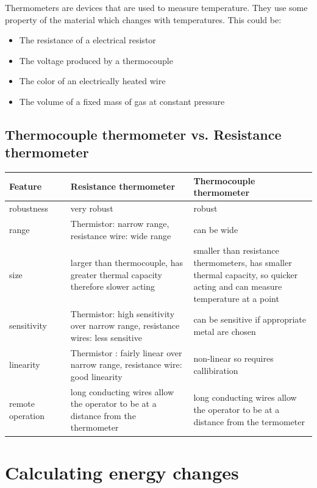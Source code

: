 \documentclass{scrbook}
\begin{document}
	Thermometers are devices that are used to measure temperature. They use some property of the material which changes with temperatures. This could be:

	\begin{itemize}
		\item
			The resistance of a electrical resistor
		\item
			The voltage produced by a thermocouple
		\item
			The color of an electrically heated wire
		\item
			The volume of a fixed mass of gas at constant pressure
	\end{itemize}

\subsection{Thermocouple thermometer vs. Resistance thermometer}


	\begin{tabular}{| p{0.2\linewidth} | p{0.4\linewidth} | p{0.4\linewidth} |}
		\hline
		Feature & Resistance thermometer & Thermocouple thermometer \\
		\hline
		robustness & very robust & robust \\
		range & Thermistor: narrow range, resistance wire: wide range & can be wide \\
		size & larger than thermocouple, has greater thermal capacity therefore slower acting & smaller than resistance thermometers, has smaller thermal capacity, so quicker acting and can measure temperature at a point \\
		sensitivity & Thermistor: high sensitivity over narrow range, resistance wires: less sensitive & can be sensitive if appropriate metal are chosen \\
		linearity & Thermistor : fairly linear over narrow range, resistance wire: good linearity & non-linear so requires callibiration \\
		remote operation & long conducting wires allow the operator to be at a distance from the thermometer & long conducting wires allow the operator to be at a distance from the termometer \\
		\hline
	\end{tabular}

\section{Calculating energy changes}
\end{document}
